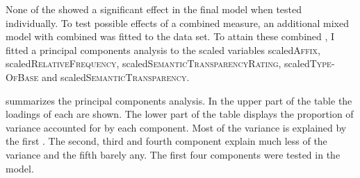 None of the  showed a significant effect in the final model when tested individually. To test possible effects of a combined  measure, an additional mixed model with combined  was fitted to the data set.  
To attain these combined , I fitted a principal components analysis to the scaled variables scaled\textsc{Affix}, scaled\textsc{RelativeFrequency}, scaled\textsc{SemanticTransparencyRating}, scaled\textsc{Type-OfBase} and scaled\textsc{SemanticTransparency}.





 summarizes the principal components analysis. In the upper part of the table the loadings of each  are shown. The lower part of the table displays the proportion of variance accounted for by each component. 
Most of the variance is explained by the first . The second, third and fourth component explain much less of the variance and the fifth barely any.  The first four components were tested in the model. 


\begin{table}
	\caption{ Summary of principal components}
	\label{tbl: summary PC im exp}

	
	
\end{table}




